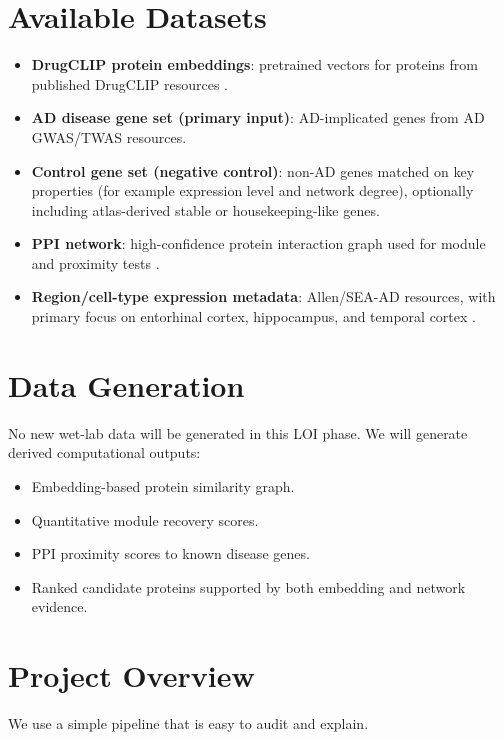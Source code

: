 \documentclass{article}
\begin{document}
\section{Available Datasets}
\begin{itemize}
    \item \textbf{DrugCLIP protein embeddings}: pretrained vectors for proteins from published DrugCLIP resources \cite{adGwas2025, drugclipData2024}.
    \item \textbf{AD disease gene set (primary input)}: AD-implicated genes from AD GWAS/TWAS resources.
    \item \textbf{Control gene set (negative control)}: non-AD genes matched on key properties (for example expression level and network degree), optionally including atlas-derived stable or housekeeping-like genes.
    \item \textbf{PPI network}: high-confidence protein interaction graph used for module and proximity tests \cite{string2018, string2019}.
    \item \textbf{Region/cell-type expression metadata}: Allen/SEA-AD resources, with primary focus on entorhinal cortex, hippocampus, and temporal cortex \cite{allenAtlas2012, seaad2024}.
\end{itemize}

\section{Data Generation}
No new wet-lab data will be generated in this LOI phase. We will generate derived computational outputs:
\begin{itemize}
    \item Embedding-based protein similarity graph.
    \item Quantitative module recovery scores.
    \item PPI proximity scores to known disease genes.
    \item Ranked candidate proteins supported by both embedding and network evidence.
\end{itemize}

\section{Project Overview}

We use a simple pipeline that is easy to audit and explain.
\end{document}
